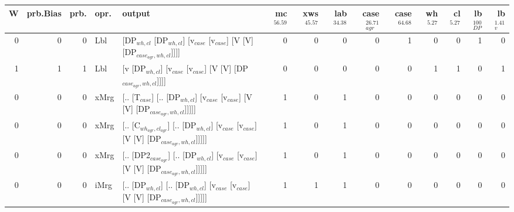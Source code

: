 \begin{tabularx}{\linewidth}{rrrlXrrrrrrrrr}
\hline
   W &   prb.Bias &   prb. & opr.   & output                                                                                                           &   mc$^{56.59}$ &   xws$^{45.57}$ &   lab$^{34.38}$ &   case$_{agr}^{26.71}$ &   case$^{64.68}$ &   wh$^{5.27}$ &   cl$^{5.27}$ &   lb$_{DP}^{100}$ &   lb$_{v}^{1.41}$ \\
\hline
   0 &       0 &   0 & Lbl  & [DP$_{wh,cl}$ [DP$_{wh,cl}$] [v$_{case}$ [v$_{case}$] [V [V] [DP$_{case_{agr},wh,cl}$]]]]                                              &            0 &             0 &             0 &                  0 &              1 &           0 &           0 &                1 &             0 \\
   1 &       1 &   1 & Lbl  & [v [DP$_{wh,cl}$] [v$_{case}$ [v$_{case}$] [V [V] [DP$_{case_{agr},wh,cl}$]]]]                                                     &            0 &             0 &             0 &                  0 &              0 &           1 &           1 &                0 &             1 \\
   0 &       0 &   0 & xMrg & [.. [T$_{case}$] [.. [DP$_{wh,cl}$] [v$_{case}$ [v$_{case}$] [V [V] [DP$_{case_{agr},wh,cl}$]]]]]                                      &            1 &             0 &             1 &                  0 &              0 &           0 &           0 &                0 &             0 \\
   0 &       0 &   0 & xMrg & [.. [C$_{wh_{agr},cl_{agr}}$] [.. [DP$_{wh,cl}$] [v$_{case}$ [v$_{case}$] [V [V] [DP$_{case_{agr},wh,cl}$]]]]]                             &            1 &             0 &             1 &                  0 &              0 &           0 &           0 &                0 &             0 \\
   0 &       0 &   0 & xMrg & [.. [DP2$_{case_{agr}}$] [.. [DP$_{wh,cl}$] [v$_{case}$ [v$_{case}$] [V [V] [DP$_{case_{agr},wh,cl}$]]]]]                                &            1 &             0 &             1 &                  0 &              0 &           0 &           0 &                0 &             0 \\
   0 &       0 &   0 & iMrg & [.. [DP$_{wh,cl}$] [.. [DP$_{wh,cl}$] [v$_{case}$ [v$_{case}$] [V [V] [DP$_{case_{agr},wh,cl}$]]]]]                                    &            1 &             1 &             1 &                  0 &              0 &           0 &           0 &                0 &             0 \\

\end{tabularx}
